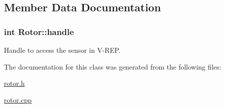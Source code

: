 \subsection{Member Data Documentation}
\subsubsection[{\texorpdfstring{handle}{handle}}]{\setlength{\rightskip}{0pt plus 5cm}int Rotor\+::handle}\hypertarget{classRotor_ae6da9102b10f4759201a62117f6b2b6e}{}\label{classRotor_ae6da9102b10f4759201a62117f6b2b6e}


Handle to access the sensor in V-\/\+R\+EP. 



The documentation for this class was generated from the following files\+:\begin{DoxyCompactItemize}
\item 
\hyperlink{rotor_8h}{rotor.\+h}\item 
\hyperlink{rotor_8cpp}{rotor.\+cpp}\end{DoxyCompactItemize}
